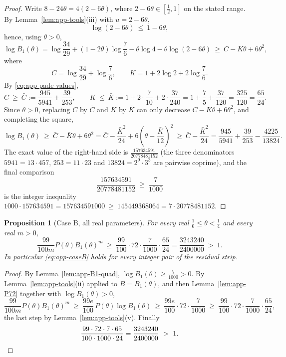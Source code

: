 \documentclass[11pt]{article}
\newtheorem{proposition}[theorem]{Proposition}
\theoremstyle{remark}
\theoremstyle{plain}
\theoremstyle{plain}
\begin{document}
\begin{proof}
Write $8-24\theta=4(2-6\theta)$, where $2-6\theta\in[\frac12,1]$ on the
stated range.  By Lemma~\ref{lem:app-tools}(iii) with $u=2-6\theta$,
\[
        \log(2-6\theta)\ \le\ 1-6\theta,
\]
hence, using $\theta>0$,
\[
        \log B_1(\theta)
        =\log\frac{34}{29}+(1-2\theta)\log\frac76
        -\theta\log4-\theta\log(2-6\theta)
        \ \ge\ C-K\theta+6\theta^2,
\]
where
\[
        C=\log\frac{34}{29}+\log\frac76,
        \qquad
        K=1+2\log2+2\log\frac76 .
\]
By \eqref{eq:app-pade-values},
\[
        C\ \ge\ \bar C:=\frac{945}{5941}+\frac{39}{253},
        \qquad
        K\ \le\ \bar K:=1+2\cdot\frac{7}{10}+2\cdot\frac{37}{240}
        =1+\frac75+\frac{37}{120}=\frac{325}{120}=\frac{65}{24}.
\]
Since $\theta>0$, replacing $C$ by $\bar C$ and $K$ by $\bar K$ can only
decrease $C-K\theta+6\theta^2$, and completing the square,
\[
        \log B_1(\theta)
        \ \ge\ \bar C-\bar K\theta+6\theta^2
        =\bar C-\frac{\bar K^2}{24}+6\left(\theta-\frac{\bar K}{12}\right)^2
        \ \ge\ \bar C-\frac{\bar K^2}{24}
        =\frac{945}{5941}+\frac{39}{253}-\frac{4225}{13824}.
\]
The exact value of the right-hand side is
$\frac{157634591}{20778481152}$ (the three denominators
$5941=13\cdot457$, $253=11\cdot23$ and $13824=2^9\cdot3^3$ are pairwise
coprime), and the final comparison
\[
        \frac{157634591}{20778481152}\ \ge\ \frac{7}{1000}
\]
is the integer inequality
$1000\cdot157634591=157634591000\ \ge\ 145449368064=7\cdot20778481152$.
\end{proof}

\begin{proposition}[Case B, all real parameters]\label{prop:app-caseB-full}
For every real $\frac16\le\theta<\frac14$ and every real $m>0$,
\[
        \frac{99}{100m}P(\theta)B_1(\theta)^m\ \ge\
        \frac{99}{100}\cdot72\cdot\frac{7}{1000}\cdot\frac{65}{24}
        =\frac{3243240}{2400000}\ >\ 1 .
\]
In particular \eqref{eq:app-caseB} holds for every integer pair of the
residual strip.
\end{proposition}

\begin{proof}
By Lemma~\ref{lem:app-B1-quad}, $\log B_1(\theta)\ge\frac7{1000}>0$.  By
Lemma~\ref{lem:app-tools}(ii) applied to $B=B_1(\theta)$, and then
Lemma~\ref{lem:app-P72} together with $\log B_1(\theta)>0$,
\[
        \frac{99}{100m}P(\theta)B_1(\theta)^m
        \ \ge\ \frac{99e}{100}\,P(\theta)\log B_1(\theta)
        \ \ge\ \frac{99e}{100}\cdot72\cdot\frac{7}{1000}
        \ \ge\ \frac{99}{100}\cdot72\cdot\frac{7}{1000}\cdot\frac{65}{24},
\]
the last step by Lemma~\ref{lem:app-tools}(v).  Finally
\[
        \frac{99\cdot72\cdot7\cdot65}{100\cdot1000\cdot24}
        =\frac{3243240}{2400000}\ >\ 1 . \qedhere
\]
\end{proof}
\end{document}
